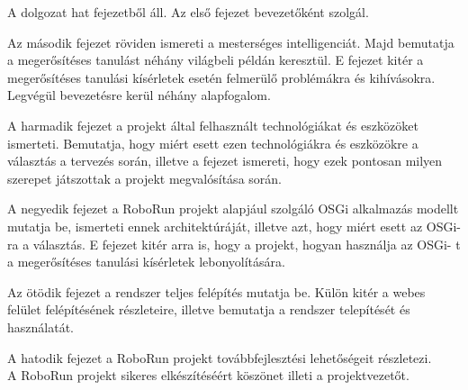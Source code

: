 	A dolgozat hat fejezetből áll. Az első fejezet bevezetőként szolgál.
	
	 Az második fejezet röviden ismereti a mesterséges intelligenciát. Majd bemutatja a megerősítéses tanulást néhány világbeli példán keresztül. E fejezet kitér a megerősítéses tanulási kísérletek esetén felmerülő problémákra és kihívásokra. Legvégül bevezetésre kerül néhány alapfogalom.

	A harmadik fejezet a projekt által felhasznált technológiákat és eszközöket ismerteti. Bemutatja, hogy miért esett ezen technológiákra és eszközökre a választás a tervezés során, illetve a fejezet ismereti, hogy ezek pontosan milyen szerepet játszottak a projekt megvalósítása során.	 
	
	A negyedik fejezet a RoboRun projekt alapjául szolgáló OSGi alkalmazás modellt mutatja be, ismerteti ennek architektúráját, illetve azt, hogy  miért esett az OSGi-ra a választás. E fejezet kitér arra is, hogy a projekt, hogyan használja az OSGi- t a megerősítéses tanulási kísérletek lebonyolítására.
	
	Az ötödik fejezet a rendszer teljes felépítés mutatja be. Külön kitér a webes felület felépítésének részleteire, illetve bemutatja a rendszer telepítését és használatát.
	
	A hatodik fejezet a RoboRun projekt továbbfejlesztési lehetőségeit részletezi.
\\A RoboRun projekt sikeres elkészítéséért köszönet illeti a projektvezetőt.
